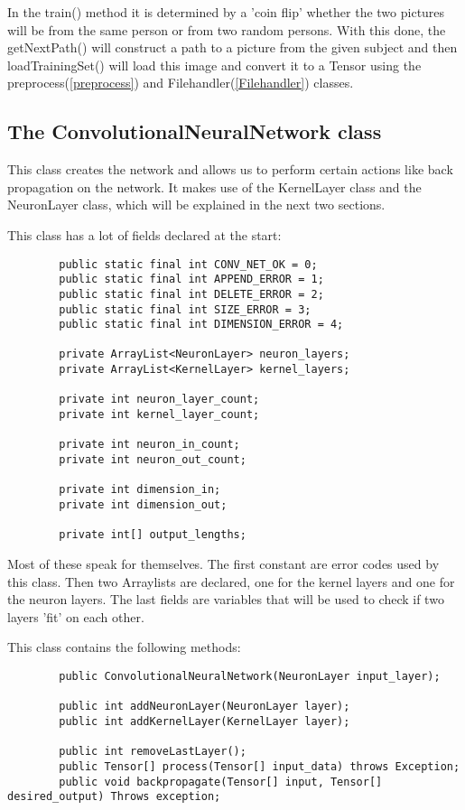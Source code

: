 \documentclass[12pt, titlepage]{article}
\begin{document}
		In the train() method it is determined by a 'coin flip' whether the two pictures will be from the same person or from two random persons. With this done, the getNextPath() will construct a path to a picture from the given subject and then loadTrainingSet() will load this image and convert it to a Tensor using the preprocess(\ref{preprocess}) and Filehandler(\ref{Filehandler}) classes.
		
		\pagebreak
		
		\subsection{The ConvolutionalNeuralNetwork class}
		This class creates the network and allows us to perform certain actions like back propagation on the network. It makes use of the KernelLayer class and the NeuronLayer class, which will be explained in the next two sections.
		
		This class has a lot of fields declared at the start:
		\begin{lstlisting}
		public static final int CONV_NET_OK = 0;
		public static final int APPEND_ERROR = 1;
		public static final int DELETE_ERROR = 2;
		public static final int SIZE_ERROR = 3;
		public static final int DIMENSION_ERROR = 4;
		
		private ArrayList<NeuronLayer> neuron_layers;
		private ArrayList<KernelLayer> kernel_layers;
		
		private int neuron_layer_count;
		private int kernel_layer_count;
		
		private int neuron_in_count;
		private int neuron_out_count;
		
		private int dimension_in;
		private int dimension_out;
		
		private int[] output_lengths;
		\end{lstlisting}
		
		Most of these speak for themselves. The first constant are error codes used by this class. Then two Arraylists are declared, one for the kernel layers and one for the neuron layers. The last fields are variables that will be used to check if two layers 'fit' on each other.
		
		This class contains the following methods:
		\begin{lstlisting}
		public ConvolutionalNeuralNetwork(NeuronLayer input_layer);
		
		public int addNeuronLayer(NeuronLayer layer);
		public int addKernelLayer(KernelLayer layer);
		
		public int removeLastLayer();
		public Tensor[] process(Tensor[] input_data) throws Exception;
		public void backpropagate(Tensor[] input, Tensor[] desired_output) Throws exception;
		\end{lstlisting}
		
\end{document}
